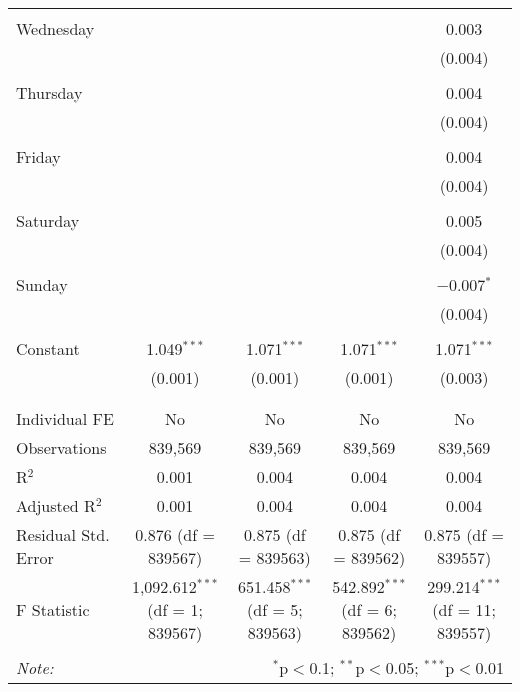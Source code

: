 \documentclass[
]{article}
\begin{document}
\begin{table}[!htbp]
{\begin{tabular}{@{\extracolsep{5pt}}lcccc}
  & & & & \\ 
 Wednesday &  &  &  & 0.003 \\ 
  &  &  &  & (0.004) \\ 
  & & & & \\ 
 Thursday &  &  &  & 0.004 \\ 
  &  &  &  & (0.004) \\ 
  & & & & \\ 
 Friday &  &  &  & 0.004 \\ 
  &  &  &  & (0.004) \\ 
  & & & & \\ 
 Saturday &  &  &  & 0.005 \\ 
  &  &  &  & (0.004) \\ 
  & & & & \\ 
 Sunday &  &  &  & $-$0.007$^{*}$ \\ 
  &  &  &  & (0.004) \\ 
  & & & & \\ 
 Constant & 1.049$^{***}$ & 1.071$^{***}$ & 1.071$^{***}$ & 1.071$^{***}$ \\ 
  & (0.001) & (0.001) & (0.001) & (0.003) \\ 
  & & & & \\ 
\hline \\[-1.8ex] 
Individual FE & No & No & No & No \\ 
Observations & 839,569 & 839,569 & 839,569 & 839,569 \\ 
R$^{2}$ & 0.001 & 0.004 & 0.004 & 0.004 \\ 
Adjusted R$^{2}$ & 0.001 & 0.004 & 0.004 & 0.004 \\ 
Residual Std. Error & 0.876 (df = 839567) & 0.875 (df = 839563) & 0.875 (df = 839562) & 0.875 (df = 839557) \\ 
F Statistic & 1,092.612$^{***}$ (df = 1; 839567) & 651.458$^{***}$ (df = 5; 839563) & 542.892$^{***}$ (df = 6; 839562) & 299.214$^{***}$ (df = 11; 839557) \\ 
\hline 
\hline \\[-1.8ex] 
\textit{Note:}  & \multicolumn{4}{r}{$^{*}$p$<$0.1; $^{**}$p$<$0.05; $^{***}$p$<$0.01} \\ 
\end{tabular}
} 
\end{table} 
\newpage
\end{document}
